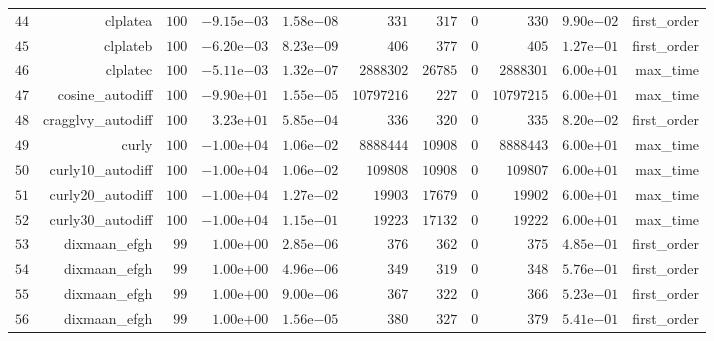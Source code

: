 \documentclass[varwidth=20cm,crop=true]{standalone}
\begin{document}
\begin{longtable}{rrrrrrrrrrr}
  \(    44\) & clplatea & \(   100\) & \(-9.15\)e\(-03\) & \( 1.58\)e\(-08\) & \(   331\) & \(   317\) & \(     0\) & \(   330\) & \( 9.90\)e\(-02\) & first\_order \\
  \(    45\) & clplateb & \(   100\) & \(-6.20\)e\(-03\) & \( 8.23\)e\(-09\) & \(   406\) & \(   377\) & \(     0\) & \(   405\) & \( 1.27\)e\(-01\) & first\_order \\
  \(    46\) & clplatec & \(   100\) & \(-5.11\)e\(-03\) & \( 1.32\)e\(-07\) & \(2888302\) & \( 26785\) & \(     0\) & \(2888301\) & \( 6.00\)e\(+01\) & max\_time \\
  \(    47\) & cosine\_autodiff & \(   100\) & \(-9.90\)e\(+01\) & \( 1.55\)e\(-05\) & \(10797216\) & \(   227\) & \(     0\) & \(10797215\) & \( 6.00\)e\(+01\) & max\_time \\
  \(    48\) & cragglvy\_autodiff & \(   100\) & \( 3.23\)e\(+01\) & \( 5.85\)e\(-04\) & \(   336\) & \(   320\) & \(     0\) & \(   335\) & \( 8.20\)e\(-02\) & first\_order \\
  \(    49\) & curly & \(   100\) & \(-1.00\)e\(+04\) & \( 1.06\)e\(-02\) & \(8888444\) & \( 10908\) & \(     0\) & \(8888443\) & \( 6.00\)e\(+01\) & max\_time \\
  \(    50\) & curly10\_autodiff & \(   100\) & \(-1.00\)e\(+04\) & \( 1.06\)e\(-02\) & \(109808\) & \( 10908\) & \(     0\) & \(109807\) & \( 6.00\)e\(+01\) & max\_time \\
  \(    51\) & curly20\_autodiff & \(   100\) & \(-1.00\)e\(+04\) & \( 1.27\)e\(-02\) & \( 19903\) & \( 17679\) & \(     0\) & \( 19902\) & \( 6.00\)e\(+01\) & max\_time \\
  \(    52\) & curly30\_autodiff & \(   100\) & \(-1.00\)e\(+04\) & \( 1.15\)e\(-01\) & \( 19223\) & \( 17132\) & \(     0\) & \( 19222\) & \( 6.00\)e\(+01\) & max\_time \\
  \(    53\) & dixmaan\_efgh & \(    99\) & \( 1.00\)e\(+00\) & \( 2.85\)e\(-06\) & \(   376\) & \(   362\) & \(     0\) & \(   375\) & \( 4.85\)e\(-01\) & first\_order \\
  \(    54\) & dixmaan\_efgh & \(    99\) & \( 1.00\)e\(+00\) & \( 4.96\)e\(-06\) & \(   349\) & \(   319\) & \(     0\) & \(   348\) & \( 5.76\)e\(-01\) & first\_order \\
  \(    55\) & dixmaan\_efgh & \(    99\) & \( 1.00\)e\(+00\) & \( 9.00\)e\(-06\) & \(   367\) & \(   322\) & \(     0\) & \(   366\) & \( 5.23\)e\(-01\) & first\_order \\
  \(    56\) & dixmaan\_efgh & \(    99\) & \( 1.00\)e\(+00\) & \( 1.56\)e\(-05\) & \(   380\) & \(   327\) & \(     0\) & \(   379\) & \( 5.41\)e\(-01\) & first\_order \\

\end{longtable}
\end{document}
